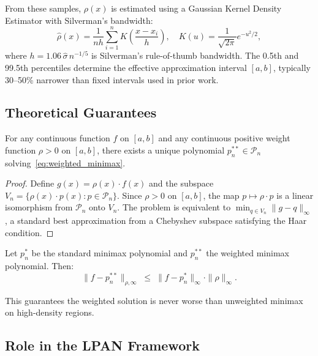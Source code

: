 From these samples, $\rho(x)$ is estimated using a Gaussian Kernel Density Estimator with Silverman's bandwidth:
\begin{equation}
    \hat{\rho}(x) = \frac{1}{nh} \sum_{i=1}^{n} K\!\left(\frac{x - x_i}{h}\right), \quad K(u) = \frac{1}{\sqrt{2\pi}} e^{-u^2/2},
    \label{eq:kde}
\end{equation}
where $h = 1.06\, \hat{\sigma}\, n^{-1/5}$ is Silverman's rule-of-thumb bandwidth. The 0.5th and 99.5th percentiles determine the effective approximation interval $[a, b]$, typically 30--50\% narrower than fixed intervals used in prior work.

\subsection{Theoretical Guarantees}

\begin{theorem}
\label{thm:weighted_existence}
For any continuous function $f$ on $[a,b]$ and any continuous positive weight function $\rho > 0$ on $[a,b]$, there exists a unique polynomial $p_n^{**} \in \mathcal{P}_n$ solving~\eqref{eq:weighted_minimax}.
\end{theorem}

\begin{proof}
Define $g(x) = \rho(x) \cdot f(x)$ and the subspace $V_n = \{\rho(x) \cdot p(x) : p \in \mathcal{P}_n\}$. Since $\rho > 0$ on $[a,b]$, the map $p \mapsto \rho \cdot p$ is a linear isomorphism from $\mathcal{P}_n$ onto $V_n$. The problem is equivalent to $\min_{q \in V_n} \|g - q\|_\infty$, a standard best approximation from a Chebyshev subspace satisfying the Haar condition.
\end{proof}

\begin{theorem}
\label{thm:weighted_error}
Let $p_n^*$ be the standard minimax polynomial and $p_n^{**}$ the weighted minimax polynomial. Then:
\begin{equation}
    \|f - p_n^{**}\|_{\rho,\infty} \;\leq\; \|f - p_n^*\|_\infty \cdot \|\rho\|_\infty.
    \label{eq:weighted_error_bound}
\end{equation}
\end{theorem}

This guarantees the weighted solution is never worse than unweighted minimax on high-density regions.

\subsection{Role in the LPAN Framework}

